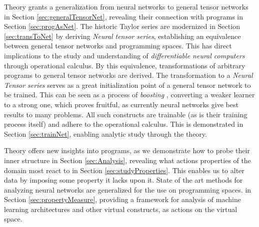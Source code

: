 \documentclass[smallcondensed]{svjour3}
\begin{document}
Theory grants a generalization from neural networks to general tensor networks in Section \ref{sec:generalTensorNet}, revealing their connection with programs in Section \ref{sec:progAsNet}.
The historic Taylor series are modernized in Section \ref{sec:transToNet} by deriving \emph{Neural tensor series}, establishing an equivalence between general tensor networks and programming spaces. This has direct implications to the study and understanding of \emph{differentiable neural computers} \cite{netRam} through operational calculus. By this equivalence, transformations of arbitrary programs to general tensor networks are derived. The transformation to a \emph{Neural Tensor series} serves as a great initialization point of a general tensor network to be trained. This can be seen as a process of \emph{boosting} \cite{boosting}, converting a weaker learner to a strong one, which proves fruitful, as currently neural networks give best results to many problems.
 All such constructs are trainable (as is their training process itself) and adhere to the operational calculus. This is demonstrated in Section \ref{sec:trainNet}, enabling analytic study through the theory.

Theory offers new insights into programs, as we demonstrate how to probe their inner structure in Section \ref{sec:Analysis}, revealing what actions properties of the domain most react to in Section \ref{sec:studyProperties}. This enables us to alter data by imposing some property it lacks upon it.
State of the art methods for analyzing neural networks \cite{DeepDream} are generalized for the use on programming spaces. in Section \ref{sec:propertyMeasure}, providing a framework for analysis of machine learning architectures and other virtual constructs, as actions on the virtual space. 
\end{document}

